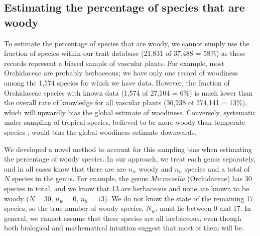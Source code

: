 \documentclass[a4paper,12pt]{article}
\begin{document}

\subsection{Estimating the percentage of species that are woody}

To estimate the percentage of species that are woody, we cannot simply
use the fraction of species within our trait database (21,831 of
37,488 = 58\%) as these records represent a biased sample of vascular
plants.
For example, most Orchidaceae are probably herbaceous; we have only
one record of woodiness among the 1,574 species for which we have
data.
However, the fraction of Orchidaceae species with known data (1,574 of
27,104 = 6\%)
is much lower than the overall rate of knowledge for all vascular
plants (36,238 of 274,141 = 13\%), which will upwardly bias the global
estimate of woodiness.
%
Conversely, systematic under-sampling of tropical species, believed to
be more woody than temperate species \citep{Molesheihgt}, would bias
the global woodiness estimate downwards.


We developed a novel method to account for this sampling bias when
estimating the percentage of woody species.  In our approach, we treat
each genus separately, and in all cases know that there are are $n_w$
woody and $n_h$ species and a total of $N$ species in the genus.
%
For example, the genus \textit{Microcoelia} (Orchidaceae) has 30
species in total, and we know that 13 are herbaceous and none are
known to be woody ($N = 30$, $n_w = 0$, $n_h = 13$). We do not know
the state of the remaining 17 species, so the true number of woody
species, $N_w$, must lie between 0 and 17. In general, we cannot
assume that these species are all herbaceous, even though both
biological and mathematical intuition suggest that most of them will
be.
\end{document}
